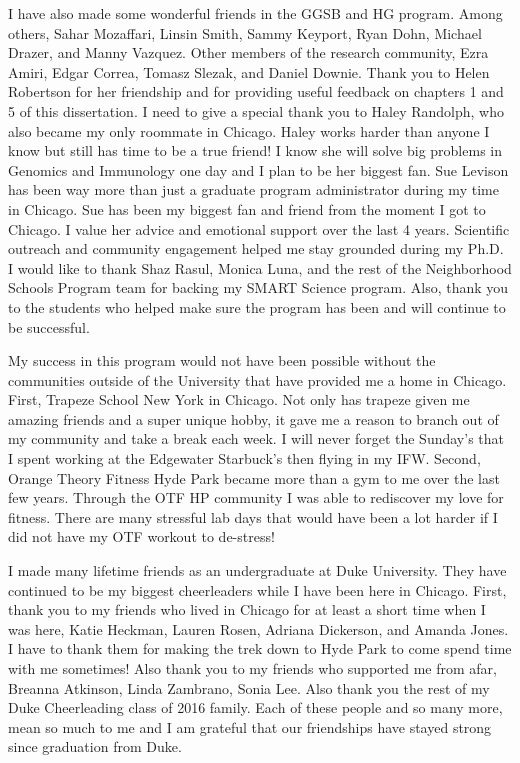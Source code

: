 I have also made some wonderful friends in the GGSB and HG program. Among others, Sahar Mozaffari, Linsin Smith, Sammy Keyport, Ryan Dohn, Michael Drazer, and Manny Vazquez. Other members of the research community, Ezra Amiri, Edgar Correa, Tomasz Slezak, and Daniel Downie. Thank you to Helen Robertson for her friendship and for providing useful feedback on chapters 1 and 5 of this dissertation. I need to give a special thank you to Haley Randolph, who also became my only roommate in Chicago. Haley works harder than anyone I know but still has time to be a true friend! I know she will solve big problems in Genomics and Immunology one day and I plan to be her biggest fan. 
Sue Levison has been way more than just a graduate program administrator during my time in Chicago. Sue has been my biggest fan and friend from the moment I got to Chicago. I value her advice and emotional support over the last 4 years. 
Scientific outreach and community engagement helped me stay grounded during my Ph.D. I would like to thank Shaz Rasul, Monica Luna, and the rest of the Neighborhood Schools Program team for backing my SMART Science program. Also, thank you to the students who helped make sure the program has been and will continue to be successful. 

My success in this program would not have been possible without the communities outside of the University that have provided me a home in Chicago. First, Trapeze School New York in Chicago. Not only has trapeze given me amazing friends and a super unique hobby, it gave me a reason to branch out of my community and take a break each week. I will never forget the Sunday's that I spent working at the Edgewater Starbuck's then flying in my IFW. Second, Orange Theory Fitness Hyde Park became more than a gym to me over the last few years. Through the OTF HP community I was able to rediscover my love for fitness. There are many stressful lab days that would have been a lot harder if I did not have my OTF workout to de-stress! 

I made many lifetime friends as an undergraduate at Duke University. They have continued to be my biggest cheerleaders while I have been here in Chicago. First, thank you to my friends who lived in Chicago for at least a short time when I was here, Katie Heckman, Lauren Rosen, Adriana Dickerson, and Amanda Jones. I have to thank them for making the trek down to Hyde Park to come spend time with me sometimes! Also thank you to my friends who supported me from afar, Breanna Atkinson, Linda Zambrano, Sonia Lee. Also thank you the rest of my Duke Cheerleading class of 2016 family. Each of these people and so many more, mean so much to me and I am grateful that our friendships have stayed strong since graduation from Duke.

